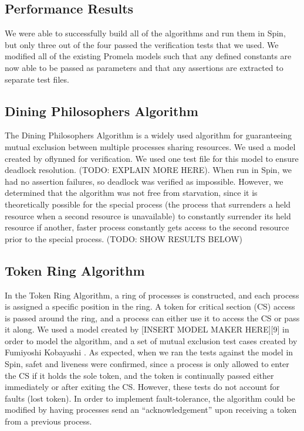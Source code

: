 \documentclass[12pt]{article}
\begin{document}
\begin{flushleft}
\section{Performance Results}
We were able to successfully build all of the algorithms and run them in Spin,
but only three out of the four passed the verification tests that we used. We
modified all of the existing Promela models such that any defined constants are
now able to be passed as parameters and that any assertions are extracted to
separate test files.

\subsection{Dining Philosophers Algorithm}
The Dining Philosophers Algorithm is a widely used algorithm for guaranteeing
mutual exclusion between multiple processes sharing resources. We used a model
created by oflynned \cite{din:phil} for verification. We used one test file for
this model to ensure deadlock resolution. (TODO: EXPLAIN MORE HERE). When run in
Spin, we had no assertion failures, so deadlock was verified as
impossible. However, we determined that the algorithm was not free from
starvation, since it is theoretically possible for the special process (the
process that surrenders a held resource when a second resource is unavailable)
to constantly surrender its held resource if another, faster process constantly
gets access to the second resource prior to the special process. (TODO: SHOW
RESULTS BELOW)

\subsection{Token Ring Algorithm}
In the Token Ring Algorithm, a ring of processes is constructed, and each
process is assigned a specific position in the ring. A token for critical
section (CS) access is passed around the ring, and a process can either use it
to access the CS or pass it along. We used a model created by [INSERT MODEL
MAKER HERE][9] in order to model the algorithm, and a set of mutual exclusion
test cases created by Fumiyoshi Kobayashi \cite{kobayashi}. As expected, when we
ran the tests against the model in Spin, safet and liveness were confirmed,
since a process is only allowed to enter the CS if it holds the sole token, and
the token is continually passed either immediately or after exiting the
CS. However, these tests do not account for faults (lost token). In order to
implement fault-tolerance, the algorithm could be modified by having processes
send an “acknowledgement” upon receiving a token from a previous process.


\end{flushleft}
\end{document}
